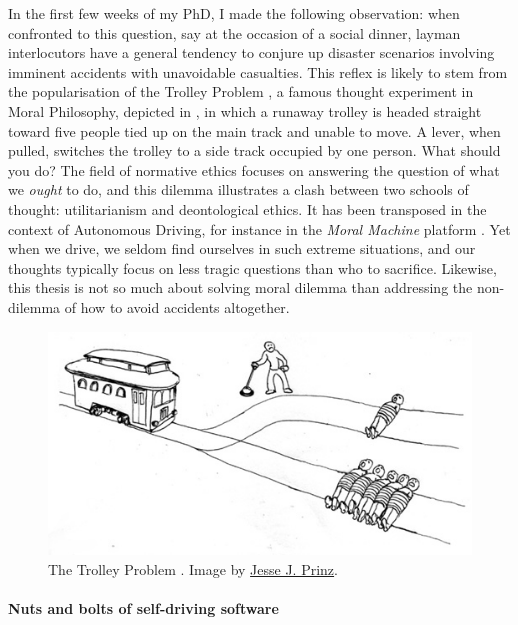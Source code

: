In the first few weeks of my PhD, I made the following observation: when confronted to this question, say at the occasion of a social dinner, layman interlocutors have a general tendency to conjure up disaster scenarios involving imminent accidents with unavoidable casualties. 
This reflex is likely to stem from the popularisation of the Trolley Problem \citep{Foot1967}, a famous thought experiment in Moral Philosophy, depicted in , in which a runaway trolley is headed straight toward five people tied up on the main track and unable to move. A lever, when pulled, switches the trolley to a side track occupied by one person. What should you do? The field of normative ethics focuses on answering the question of what we \emph{ought} to do, and this dilemma illustrates a clash between two schools of thought: utilitarianism and deontological ethics. 
It has been transposed in the context of Autonomous Driving, for instance in the \emph{Moral Machine} platform \citep{Awad2018}.
Yet when we drive, we seldom find ourselves in such extreme situations, and our thoughts typically focus on less tragic questions than who to sacrifice.
Likewise, this thesis is not so much about solving moral dilemma than addressing the non-dilemma of how to avoid accidents altogether.%
\begin{figure}[tp]
	\centering
	\includegraphics[width=0.7\linewidth]{img/trolley}
	\caption{The Trolley Problem \citep{Foot1967}. Image by \href{http://subcortex.com/}{Jesse J. Prinz}.}
	\label{fig:trolley}
\end{figure}

\paragraph{Nuts and bolts of self-driving software}

